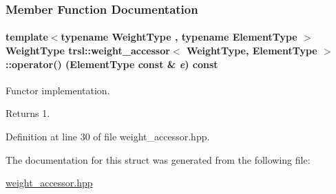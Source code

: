 \subsubsection{Member Function Documentation}
\hypertarget{structtrsl_1_1weight__accessor_a2d2ff14708898b56d65c93223f413a17}{
\paragraph[{operator()}]{\setlength{\rightskip}{0pt plus 5cm}template$<$typename WeightType , typename ElementType $>$ WeightType {\bf trsl::weight\_\-accessor}$<$ WeightType, ElementType $>$::operator() (ElementType const \& {\em e}) const}\hfill}
\label{structtrsl_1_1weight__accessor_a2d2ff14708898b56d65c93223f413a17}


Functor implementation. \begin{DoxyReturn}{Returns}
1. 
\end{DoxyReturn}


Definition at line 30 of file weight\_\-accessor.hpp.

The documentation for this struct was generated from the following file:\begin{DoxyCompactItemize}
\item 
\hyperlink{weight__accessor_8hpp}{weight\_\-accessor.hpp}\end{DoxyCompactItemize}
